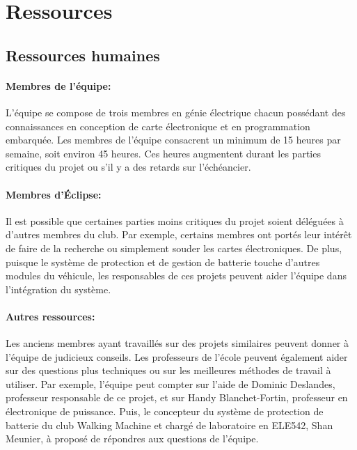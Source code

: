 \section{Ressources}

	
	\subsection{Ressources humaines}
	
		\paragraph{Membres de l'équipe:}
		L'équipe se compose de trois membres en génie électrique chacun possédant des connaissances en conception de carte électronique et en programmation embarquée. Les membres de l'équipe consacrent un minimum de 15 heures par semaine, soit environ 45 heures. Ces heures augmentent durant les parties critiques du projet ou s'il y a des retards sur l'échéancier.
	
		\paragraph{Membres d'Éclipse:}
		Il est possible que certaines parties moins critiques du projet soient déléguées à d'autres membres du club. Par exemple, certains membres ont portés leur intérêt de faire de la recherche ou simplement souder les cartes électroniques. De plus, puisque le système de protection et de gestion de batterie touche d'autres modules du véhicule, les responsables de ces projets peuvent aider l'équipe dans l'intégration du système.
		
		\paragraph{Autres ressources:}
		Les anciens membres ayant travaillés sur des projets similaires peuvent donner à l'équipe de judicieux conseils. Les professeurs de l'école peuvent également aider sur des questions plus techniques ou sur les meilleures méthodes de travail à utiliser. Par exemple, l'équipe peut compter sur l'aide de Dominic Deslandes, professeur responsable de ce projet, et sur Handy Blanchet-Fortin, professeur en électronique de puissance. Puis, le concepteur du système de protection de batterie du club Walking Machine et chargé de laboratoire en ELE542, Shan Meunier, à proposé de répondres aux questions de l'équipe.
		
		
	

